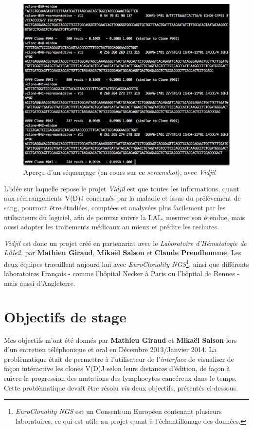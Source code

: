 \documentclass[pdftex,12pt,a4paper]{report}
\begin{document}
\begin{spacing}{1.2}
\begin{figure}[H]
\begin{center}
	\includegraphics[scale=0.6]{img/C++-Ex.jpg}
\end{center}
\caption{Aperçu d'un séquençage (en cours sur ce \textit{screenshot}), avec \textit{Vidjil}}
\label{fig:c++}
\end{figure}

L'idée sur laquelle repose le projet \textit{Vidjil} est que toutes les informations, quant aux réarrangements V(D)J concernés par la maladie et issus du prélévement de sang, pourront être étudiées, comptées et analysées plus facilement par les utilisateurs du logiciel, afin de pouvoir suivre la LAL, mesurer son étendue, mais aussi adapter les traitements médicaux au mieux et prédire les rechutes.

\textit{Vidjil} est donc un projet créé en partenariat avec le \textit{Laboratoire d'Hématologie de Lille2}, par \textbf{Mathieu Giraud}, \textbf{Mikaël Salson} et \textbf{Claude Preudhomme}.
Les deux équipes travaillent aujourd'hui avec \textit{EuroClonality NGS}\footnote{\textit{EuroClonality NGS} est un Consentium Européen contenant plusieurs laboratoires, ce qui est utile au projet quant à l'échantillonage des données.}, ainsi que différents laboratoires Français - comme l'hôpital Necker à Paris ou l'hôpital de Rennes - mais aussi d'Angleterre.

\section{Objectifs de stage}
Mes objectifs m'ont été donnés par \textbf{Mathieu Giraud} et \textbf{Mikaël Salson} lors d'un entretien téléphonique et oral en Décembre 2013/Janvier 2014. La problèmatique était de permettre à l'utilisateur de l'\textit{interface} de visualiser de façon intéractive les clones V(D)J selon leurs distances d'édition, de façon à suivre la progression des mutations des lymphocytes cancéreux dans le temps.
\newline
Cette problématique devait être résolu \textit{via} deux objectifs, présentés ci-dessous. 


\end{spacing}
\end{document}
